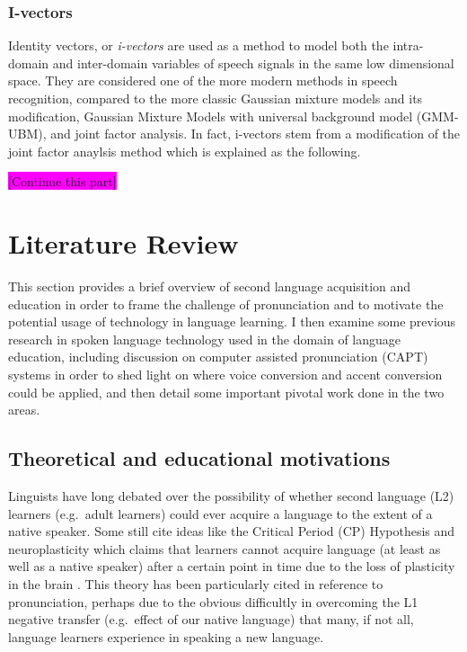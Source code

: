 \documentclass
[
    a4paper,
    twoside,
    12pt,
]
{report}
\begin{document}
\subsection{I-vectors}

Identity vectors, or \emph{i-vectors} are used as a method to model both
the intra-domain and inter-domain variables of speech signals in the
same low dimensional space. They are considered one of the more modern
methods in speech recognition, compared to the more classic Gaussian
mixture models and its modification, Gaussian Mixture Models with
universal background model (GMM-UBM), and joint factor analysis. In
fact, i-vectors stem from a modification of the joint factor anaylsis
method which is explained as the following.

\colorbox{magenta}{[Continue this part]}
\chapter{Literature Review}

This section provides a brief overview of second language acquisition
and education in order to frame the challenge of pronunciation and to
motivate the potential usage of technology in language learning. I then
examine some previous research in spoken language technology used in the
domain of language education, including discussion on computer assisted
pronunciation (CAPT) systems in order to shed light on where voice
conversion and accent conversion could be applied, and then detail some
important pivotal work done in the two areas.

\hypertarget{theoretical-and-educational-motivations}{%
\section{Theoretical and educational
motivations}\label{theoretical-and-educational-motivations}}

Linguists have long debated over the possibility of whether second
language (L2) learners (e.g.~adult learners) could ever acquire a
language to the extent of a native speaker. Some still cite ideas like
the Critical Period (CP) Hypothesis and neuroplasticity which claims
that learners cannot acquire language (at least as well as a native
speaker) after a certain point in time due to the loss of plasticity in
the brain \parencite{lenneberg1967a,scovel1988a}. This theory has been
particularly cited in reference to pronunciation, perhaps due to the
obvious difficultly in overcoming the L1 negative transfer (e.g.~effect
of our native language) that many, if not all, language learners
experience in speaking a new language.
\end{document}
